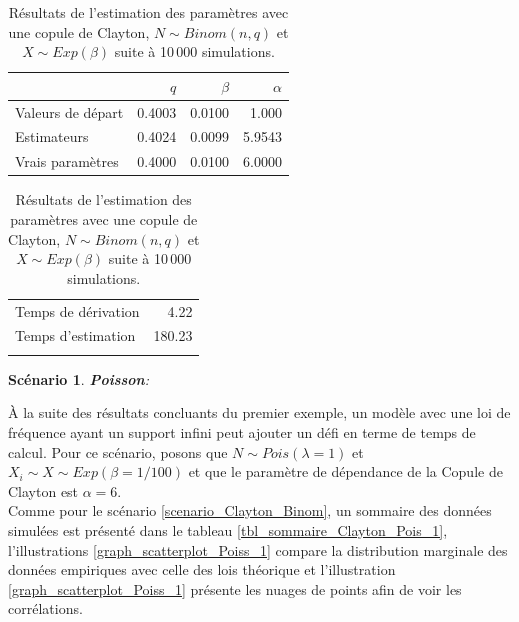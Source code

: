 \documentclass{article}
\newtheorem{Scenario}{Scénario}
\begin{document}
		\begin{table}[H]
			\centering
			\begin{tabular}{lrrr}
				\hline
				& $q$ & $\beta$ & $\alpha$ \\ 
				\hline
				Valeurs de départ & 0.4003 & 0.0100 & 1.000 \\ 
				Estimateurs & 0.4024 & 0.0099 & 5.9543 \\ 
				Vrais paramètres & 0.4000 & 0.0100 & 6.0000 \\ 
				\hline
			\end{tabular}
			\begin{tabular}{lr}
				\hline
				&  \\ 
				\hline
				Temps de dérivation & 4.22 \\ 
				Temps d'estimation & 180.23 \\ 
				\\
				\hline
			\end{tabular}
			\caption[Résultats du scénario \ref{scenario_Clayton_Binom}]{Résultats de l'estimation des paramètres avec une copule de Clayton, $N\sim Binom(n,q)$ et $X \sim Exp(\beta)$ suite à 10\,000 simulations.} 
			\label{tbl_Clayton_Binom}
		\end{table}
		
		\begin{Scenario}\label{scenario_Clayton_Pois}
			\textbf{Poisson}:
		\end{Scenario}
	
		À la suite des résultats concluants du premier exemple, un modèle avec une loi de fréquence ayant un support infini peut ajouter un défi en terme de temps de calcul. Pour ce scénario, posons que $N \sim Pois(\lambda=1)$ et $X_i \sim X \sim Exp(\beta=1/100)$ et que le paramètre de dépendance de la Copule de Clayton est $\alpha = 6$. \\
		
		Comme pour le scénario \ref{scenario_Clayton_Binom}, un sommaire des données simulées est présenté dans le tableau \ref{tbl_sommaire_Clayton_Pois_1}, l'illustrations \ref{graph_scatterplot_Poiss_1} compare la distribution marginale des données empiriques avec celle des lois théorique et l'illustration \ref{graph_scatterplot_Poiss_1} présente les nuages de points afin de voir les corrélations.
		
\end{document}
